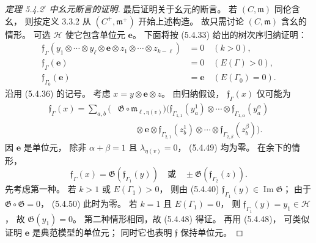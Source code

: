 \begin{proof}[定理 5.4.2$'$ 中幺元断言的证明]
最后证明关于幺元的断言。
若 $(C,\mathfrak m)$ 同伦含幺，
则按定义 3.3.2 从
$(C^+,\mathfrak m^+)$ 开始上述构造。
故只需讨论 $(C,\mathfrak m)$ 含幺的情形。
可选 $\mathcal H$ 使它包含单位元 $\mathbf e$。
下面将按 (5.4.33) 给出的树次序归纳证明：
\begin{align}
\mathfrak f_\Gamma
(y_1\otimes\cdots\otimes y_\ell
\otimes\mathbf e\otimes
z_1\otimes\cdots\otimes z_{k-\ell})
&=0\quad(k>0),
\tag{5.4.48.1}\label{eq:5-4-48-1}\\
\mathfrak f_\Gamma(\mathbf e)
&=0\quad(E(\Gamma)>0),
\tag{5.4.48.2}\label{eq:5-4-48-2}\\
\mathfrak f_{\Gamma_0}(\mathbf e)
&=\mathbf e\quad(E(\Gamma_0)=0).
\tag{5.4.48.3}\label{eq:5-4-48-3}
\end{align}
沿用 (5.4.36) 的记号。
考虑 $x=y\otimes\mathbf e\otimes z$。
由归纳假设，
$\mathfrak f_\Gamma(x)$ 仅可能为
\begin{equation}
\begin{aligned}
\mathfrak f_\Gamma(x)
=\sum_{a,b}
(&\mathfrak G\circ\mathfrak m_{\ell,\eta(v)})
\bigl(\mathfrak f_{\Gamma_{1,1}}(y_a^1)
\otimes\cdots\otimes
\mathfrak f_{\Gamma_{1,\alpha}}(y_a^\alpha)\\
&\qquad\otimes\mathbf e\otimes
\mathfrak f_{\Gamma_{2,1}}(z_b^1)
\otimes\cdots\otimes
\mathfrak f_{\Gamma_{2,\beta}}(z_b^\beta)\bigr).
\end{aligned}
\tag{5.4.49}\label{eq:5-4-49}
\end{equation}
因 $\mathbf e$ 是单位元，
除非 $\alpha+\beta=1$ 且
$\lambda_{\eta(v)}=0$，
(5.4.49) 均为零。
在余下的情形，
\begin{equation}
\mathfrak f_\Gamma(x)
=\mathfrak G(\mathfrak f_{\Gamma_1}(y))
\quad\text{或}\quad
\pm\mathfrak G(\mathfrak f_{\Gamma_2}(z)).
\tag{5.4.50}\label{eq:5-4-50}
\end{equation}
先考虑第一种。
若 $k>1$ 或 $E(\Gamma_1)>0$，
则由 (5.4.40)
$\mathfrak f_{\Gamma_1}(y)
\in\operatorname{Im}\mathfrak G$；
由于 $\mathfrak G\circ\mathfrak G=0$，
(5.4.50) 此时为零。
若 $k=1$ 且 $E(\Gamma_1)=0$，
则
$\mathfrak f_{\Gamma_1}(y)=y_1\in\mathcal H$，
故 $\mathfrak G(y_1)=0$。
第二种情形相同，故 (5.4.48) 得证。
再用 (5.4.48)，
可类似证明 $\mathbf e$ 是典范模型的单位元；
同时它也表明 $\mathfrak f$ 保持单位元。
\end{proof}

